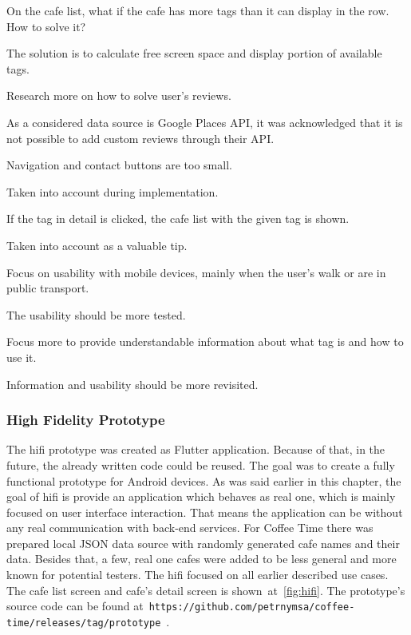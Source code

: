 \begin{questions}
  \item On the cafe list, what if the cafe has more tags than it can display in the row. How to solve it? 
         \begin{answer}
          The solution is to calculate free screen space and display portion of available tags.
         \end{answer}

  \item Research more on how to solve user's reviews.
         \begin{answer}
         As a considered data source is Google Places API, it was acknowledged that it is not possible to add custom reviews through their API.
         \end{answer}
    \item Navigation and contact buttons are too small. 
        \begin{answer}
        Taken into account during implementation.
        \end{answer}
    \item If the tag in detail is clicked, the cafe list with the given tag is shown.
        \begin{answer}
        Taken into account as a valuable tip.
        \end{answer}
    \item Focus on usability with mobile devices, mainly when the user's walk or are in public transport.
        \begin{answer}
        The usability should be more tested. 
        \end{answer}
    \item Focus more to provide understandable information about what tag is and how to use it.
     \begin{answer}
        Information and usability should be more revisited.
    \end{answer}
\end{questions}

\subsubsection{High Fidelity Prototype}
The \gls{hifi} prototype was created as Flutter application. Because of that, in the future, the already written code could be reused.  The goal was to create a fully functional prototype for Android devices. As was said earlier in this chapter, the goal of \gls{hifi} is provide an application which behaves as real one, which is mainly focused on user interface interaction. That means the application can be without any real communication with back-end services. For Coffee Time there was prepared local JSON data source with randomly generated cafe names and their data. Besides that, a few, real one cafes were added to be less general and more known for potential testers. The \gls{hifi} focused on all earlier described use cases. The cafe list screen and cafe's detail screen is shown~at~\cref{fig:hifi}. The prototype's source code can be found at~\verb|https://github.com/petrnymsa/coffee-time/releases/tag/prototype|~\cite{hifi-prototype}. 

